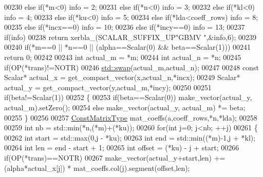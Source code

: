 \begin{DoxyCode}
00230   \textcolor{keywordflow}{else} \textcolor{keywordflow}{if}(*m<0)                                                       info = 2;
00231   \textcolor{keywordflow}{else} \textcolor{keywordflow}{if}(*n<0)                                                       info = 3;
00232   \textcolor{keywordflow}{else} \textcolor{keywordflow}{if}(*kl<0)                                                      info = 4;
00233   \textcolor{keywordflow}{else} \textcolor{keywordflow}{if}(*ku<0)                                                      info = 5;
00234   \textcolor{keywordflow}{else} \textcolor{keywordflow}{if}(*lda<coeff\_rows)                                            info = 8;
00235   \textcolor{keywordflow}{else} \textcolor{keywordflow}{if}(*incx==0)                                                   info = 10;
00236   \textcolor{keywordflow}{else} \textcolor{keywordflow}{if}(*incy==0)                                                   info = 13;
00237   \textcolor{keywordflow}{if}(info)
00238     \textcolor{keywordflow}{return} xerbla\_(SCALAR\_SUFFIX\_UP\textcolor{stringliteral}{"GBMV "},&info,6);
00239 
00240   \textcolor{keywordflow}{if}(*m==0 || *n==0 || (alpha==Scalar(0) && beta==Scalar(1)))
00241     \textcolor{keywordflow}{return} 0;
00242 
00243   \textcolor{keywordtype}{int} actual\_m = *m;
00244   \textcolor{keywordtype}{int} actual\_n = *n;
00245   \textcolor{keywordflow}{if}(OP(*trans)!=NOTR)
00246     \hyperlink{endian_8c_a3ca5ecd34b04d6a243c054ac3a57f68d}{std::swap}(actual\_m,actual\_n);
00247 
00248   \textcolor{keyword}{const} Scalar* actual\_x = get\_compact\_vector(x,actual\_n,*incx);
00249   Scalar* actual\_y = get\_compact\_vector(y,actual\_m,*incy);
00250 
00251   \textcolor{keywordflow}{if}(beta!=Scalar(1))
00252   \{
00253     \textcolor{keywordflow}{if}(beta==Scalar(0)) make\_vector(actual\_y, actual\_m).setZero();
00254     \textcolor{keywordflow}{else}                make\_vector(actual\_y, actual\_m) *= beta;
00255   \}
00256 
00257   \hyperlink{group___core___module_class_eigen_1_1_map}{ConstMatrixType} mat\_coeffs(a,coeff\_rows,*n,*lda);
00258 
00259   \textcolor{keywordtype}{int} nb = std::min(*n,(*m)+(*ku));
00260   \textcolor{keywordflow}{for}(\textcolor{keywordtype}{int} j=0; j<nb; ++j)
00261   \{
00262     \textcolor{keywordtype}{int} start = std::max(0,j - *ku);
00263     \textcolor{keywordtype}{int} end = std::min((*m)-1,j + *kl);
00264     \textcolor{keywordtype}{int} len = end - start + 1;
00265     \textcolor{keywordtype}{int} offset = (*ku) - j + start;
00266     \textcolor{keywordflow}{if}(OP(*trans)==NOTR)
00267       make\_vector(actual\_y+start,len) += (alpha*actual\_x[j]) * mat\_coeffs.col(j).segment(offset,len);

\end{DoxyCode}
